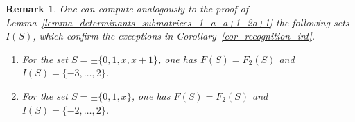 \documentclass[a4paper, 11pt]{article}
\newcommand{\Z}{\mathbb{Z}}
\newcommand{\bA}{\bm{A}}
\newcommand{\bM}{\bm{M}}
\newcommand{\indet}{x}
\newcommand{\polyring}{\Z[\indet]}
\newcommand{\polyS}{S}
\newcommand{\polyM}{\bM}
\newtheorem{lemma}{Lemma}
\newtheorem{remark}{Remark}
\begin{document}
	\begin{remark}
		\label{rem_intersections_1_x_x+1_2x+1}
		One can compute analogously to the proof of Lemma~\ref{lemma_determinants_submatrices_1_a_a+1_2a+1} the following sets $I(\polyS)$, which confirm the exceptions in Corollary~\ref{cor_recognition_int}.
		\begin{enumerate}
			\item For the set $\polyS = \pm \lbrace 0,1,\indet,\indet + 1\rbrace$, one has $F(S) = F_2(S)$ and $I(S) = \lbrace -3,\ldots,2\rbrace$.
			\item For the set $\polyS = \pm \lbrace 0,1,\indet\rbrace$, one has $F(S) = F_2(S)$ and $I(S) = \lbrace -2,\ldots,2\rbrace$.
		\end{enumerate}
	\end{remark}
\end{document}
